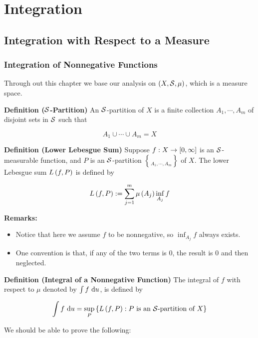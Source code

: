 \documentclass[
]{article}
\begin{document}
\hypertarget{integration}{%
\section{Integration}\label{integration}}

\hypertarget{integration-with-respect-to-a-measure}{%
\subsection{Integration with Respect to a
Measure}\label{integration-with-respect-to-a-measure}}

\hypertarget{integration-of-nonnegative-functions}{%
\subsubsection{Integration of Nonnegative
Functions}\label{integration-of-nonnegative-functions}}

Through out this chapter we base our analysis on \(\pr{X,\S,\mu}\),
which is a measure space.

\textbf{Definition (\(\S\)-Partition)} An \(\S\)-partition of \(X\) is a
finite collection \(A_1,\cdots,A_m\) of disjoint sets in \(\S\) such
that

\[A_1\cup\cdots \cup A_m = X\]

\textbf{Definition (Lower Lebesgue Sum)} Suppose
\(f:X\to \br{0,\infty}\) is an \(\S\)-measurable function, and \(P\) is
an \(\S\)-partition \(\brace{A_1,\cdots, A_m}\) of \(X\). The lower
Lebesgue sum \(L\pr{f,P}\) is defined by

\[L\pr{f,P}:=\sum_{j = 1}^m\lm{A_j}\inf_{A_j}f\]

\textbf{Remarks:}

\begin{itemize}
\item
  Notice that here we assume \(f\) to be nonnegative, so
  \(\inf_{A_j} f\) always exists.
\item
  One convention is that, if any of the two terms is \(0\), the result
  is \(0\) and then neglected.
\end{itemize}

\textbf{Definition (Integral of a Nonnegative Function)} The integral of
\(f\) with respect to \(\mu\) denoted by \(\int f \d u\), is defined by

\[\int f\d u = \sup_{P}\brace{L\pr{f,P}:P \text{ is an }\S\text{-partition of }X}\]

We should be able to prove the following:
\end{document}
